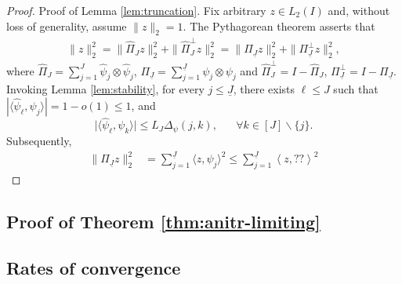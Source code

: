 \documentclass[11pt,a4paper]{article}
\renewcommand{\hat}{\widehat}
\theoremstyle{definition}
\theoremstyle{plain}
\theoremstyle{remark}
\newcommand{\mH}{\mathcal H}
\newcommand{\und}{\underline}
\begin{document}
\begin{proof}{Proof of Lemma \ref{lem:truncation}.}
Fix arbitrary $z\in L_2(I)$ and, without loss of generality, assume $\|z\|_2=1$.
The Pythagorean theorem asserts that
\begin{align}
\|z\|_2^2 = \|\hat\Pi_{J}z\|_2^2+\|\hat\Pi_{J}^\perp z\|_2^2 = \|\Pi_{\und J}z\|_2^2+\|\Pi_{\und J}^\perp z\|_2^2,
\label{eq:proof-truncation-1}
\end{align}
where $\hat\Pi_J=\sum_{j=1}^J\hat\psi_j\otimes\hat\psi_j$, $\Pi_{\und J}=\sum_{j=1}^{\und J}\psi_j\otimes\psi_j$ and $\hat\Pi_J^\perp=I-\hat\Pi_J$, $\Pi_{\und J}^\perp = I-\Pi_{\und J}$.
Invoking Lemma \ref{lem:stability}, for every $j\leq \und J$, there exists $\ell\leq J$ such that $|\langle\hat\psi_\ell,\psi_j\rangle| = 1-o(1)\leq 1$, and
$$
\big|\langle\hat\psi_\ell, \psi_k\rangle\big| \leq L_J\Delta_\psi(j,k),\;\;\;\;\;\;\forall k\in[J]\backslash\{j\}.
$$
Subsequently,
\begin{align}
\|\Pi_{\und J}z\|_2^2 &= \sum_{j=1}^{\und J}\langle z,\psi_j\rangle^2
\leq \sum_{j=1}^{\und J}\left\langle z, ??\right\rangle^2
\end{align}
\end{proof}

\subsection{Proof of Theorem \ref{thm:anitr-limiting}}

\subsection{Rates of convergence}

 
\end{document}
